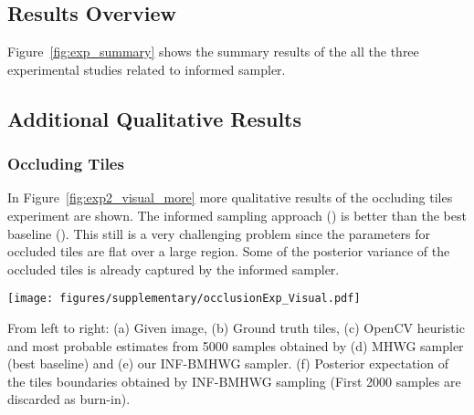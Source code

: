 \subsection{Results Overview}
Figure~\ref{fig:exp_summary} shows the summary results of the all the three
experimental studies related to informed sampler.
\begin{figure*}[h!]
\centering
  \label{fig:exp_summary}
\end{figure*}

\subsection{Additional Qualitative Results}

\subsubsection{Occluding Tiles}
In Figure~\ref{fig:exp2_visual_more} more qualitative results of the
occluding tiles experiment are shown. The informed sampling approach
(\INFBMHWG) is better than the best baseline (\MHWG). This still is a
very challenging problem since the parameters for occluded tiles are
flat over a large region. Some of the posterior variance of the
occluded tiles is already captured by the informed sampler.

\begin{figure*}[h!]
\begin{center}
\centerline{\texttt{[image: figures/supplementary/occlusionExp\_Visual.pdf]}}
  {From left to right: (a)
  Given image, (b) Ground truth tiles, (c) OpenCV heuristic and most probable estimates
  from 5000 samples obtained by (d) MHWG sampler (best baseline) and
  (e) our INF-BMHWG sampler. (f) Posterior expectation of the tiles
  boundaries obtained by INF-BMHWG sampling (First 2000 samples are
  discarded as burn-in).}
\label{fig:exp2_visual_more}
\end{center}
\end{figure*}

